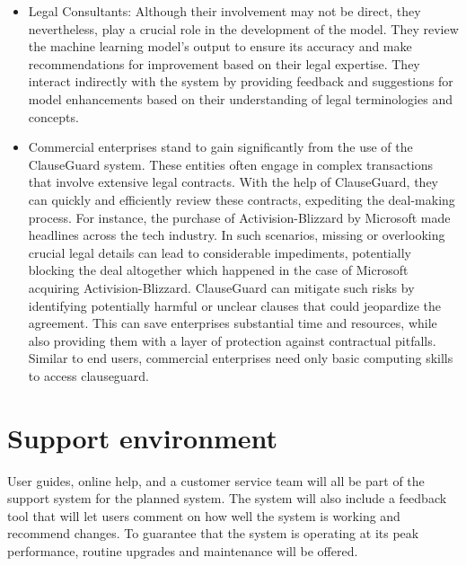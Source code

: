\begin{itemize}
    \item Legal Consultants: Although their involvement may not be direct, they nevertheless, play a crucial role in the development of the model. They review the machine learning model's output to ensure its accuracy and make recommendations for improvement based on their legal expertise. They interact indirectly with the system by providing feedback and suggestions for model enhancements based on their understanding of legal terminologies and concepts.
    \item Commercial enterprises stand to gain significantly from the use of the ClauseGuard system. These entities often engage in complex transactions that involve extensive legal contracts. With the help of ClauseGuard, they can quickly and efficiently review these contracts, expediting the deal-making process. For instance,  the  purchase of Activision-Blizzard by Microsoft made headlines across the tech industry. In such scenarios, missing or overlooking crucial legal details can lead to considerable impediments, potentially blocking the deal altogether which happened in the case of Microsoft acquiring Activision-Blizzard. ClauseGuard can mitigate such risks by identifying potentially harmful or unclear clauses that could jeopardize the agreement. This can save enterprises substantial time and resources, while also providing them with a layer of protection against contractual pitfalls. Similar to end users, commercial enterprises need only basic computing skills to access clauseguard. 

\end{itemize}


\section{Support environment \label{Section::Support Environment proposed}}
User guides, online help, and a customer service team will all be part of the support system for the planned system. The system will also include a feedback tool that will let users comment on how well the system is working and recommend changes. To guarantee that the system is operating at its peak performance, routine upgrades and maintenance will be offered.

